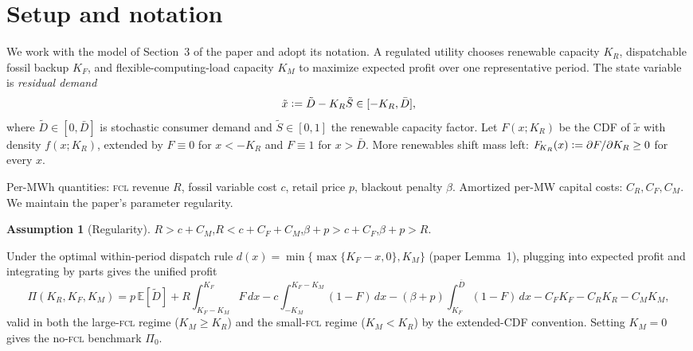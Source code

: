 \documentclass[11pt,reqno]{amsart}
\theoremstyle{plain}
\theoremstyle{definition}
\newtheorem{assumption}{Assumption}
\theoremstyle{remark}
\newcommand{\KR}{K_R}
\newcommand{\KF}{K_F}
\newcommand{\KM}{K_M}
\newcommand{\Dbar}{\bar D}
\newcommand{\CM}{C_M}
\newcommand{\CF}{C_F}
\newcommand{\CR}{C_R}
\newcommand{\bp}{\beta+p}
\newcommand{\FKR}{F_{\!\KR}}
\newcommand{\E}{\mathbb{E}}
\newcommand{\eqdef}{\vcentcolon=}
\begin{document}
\maketitle

\section{Setup and notation}\label{sec:setup}

We work with the model of Section~3 of the paper and adopt its notation. A
regulated utility chooses renewable capacity $\KR$, dispatchable fossil backup
$\KF$, and flexible-computing-load capacity $\KM$ to maximize expected profit
over one representative period. The state variable is \emph{residual demand}
\begin{equation}\label{eq:resdem}
  \tilde x \eqdef \tilde D - \KR\tilde S \in[-\KR,\Dbar],
\end{equation}
where $\tilde D\in[0,\Dbar]$ is stochastic consumer demand and
$\tilde S\in[0,1]$ the renewable capacity factor. Let $F(x;\KR)$ be the CDF of
$\tilde x$ with density $f(x;\KR)$, extended by $F\equiv0$ for $x<-\KR$ and
$F\equiv1$ for $x>\Dbar$. More renewables shift mass left:
$\FKR(x)\eqdef\partial F/\partial\KR\ge 0$ for every $x$.

Per-MWh quantities: \textsc{fcl} revenue $R$, fossil variable cost $c$, retail
price $p$, blackout penalty $\beta$. Amortized per-MW capital costs:
$\CR,\CF,\CM$. We maintain the paper's parameter regularity.

\begin{assumption}[Regularity]\label{ass:reg}
$R>c+\CM$,\quad $R<c+\CF+\CM$,\quad $\bp>c+\CF$,\quad $\bp>R$.
\end{assumption}

Under the optimal within-period dispatch rule
$d(x)=\min\{\max\{\KF-x,0\},\KM\}$ (paper Lemma~1), plugging into expected
profit and integrating by parts gives the unified profit
\begin{equation}\label{eq:profit}
  \Pi(\KR,\KF,\KM)=p\,\E[\tilde D]
  +R\!\!\int_{\KF-\KM}^{\KF}\!\!\!F\,dx
  -c\!\!\int_{-\KM}^{\KF-\KM}\!\!\!(1-F)\,dx
  -(\bp)\!\!\int_{\KF}^{\Dbar}\!\!\!(1-F)\,dx
  -\CF\KF-\CR\KR-\CM\KM ,
\end{equation}
valid in both the large-\textsc{fcl} regime ($\KM\ge\KR$) and the
small-\textsc{fcl} regime ($\KM<\KR$) by the extended-CDF convention. Setting
$\KM=0$ gives the no-\textsc{fcl} benchmark $\Pi_0$.
\end{document}
